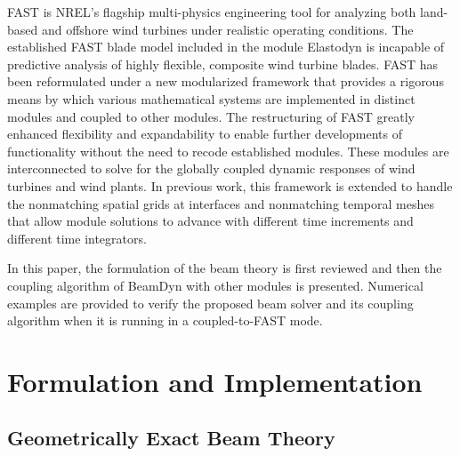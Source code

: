 \documentclass{aiaa-tc}
\begin{document}
FAST is NREL's flagship multi-physics engineering tool for analyzing both land-based and offshore wind turbines under realistic operating conditions.  
The established FAST blade model included in the module Elastodyn is incapable 
of predictive analysis of highly flexible, composite wind turbine blades. 
FAST has been reformulated under a new modularized framework that provides a rigorous means by which various mathematical systems are implemented in distinct modules and coupled to other modules. 
The restructuring of FAST greatly enhanced flexibility and expandability to enable further developments of functionality without the need to recode established modules. 
These modules are interconnected to solve for the globally coupled dynamic responses of wind turbines and wind plants. \cite{Jonkman:2013,website:FASTModularizationFramework} In previous work, this framework is extended to handle the nonmatching spatial grids at interfaces and nonmatching temporal meshes that allow module solutions to advance with different time increments and different time integrators.\cite{Sprague:FAST2015}

In this paper, the formulation of the beam theory is first reviewed and then the coupling algorithm of BeamDyn with other modules is presented. 
Numerical examples are provided to verify the proposed beam solver and its coupling algorithm when it is running in a coupled-to-FAST mode.

\section{Formulation and Implementation}

\subsection{Geometrically Exact Beam Theory}
\end{document}
